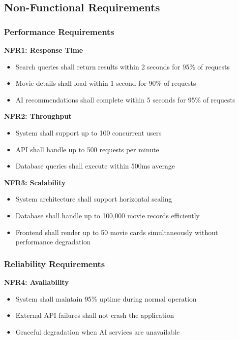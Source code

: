 \documentclass[12pt,a4paper]{article}
\begin{document}
\subsection{Non-Functional Requirements}

\subsubsection{Performance Requirements}

\textbf{NFR1: Response Time}
\begin{itemize}
    \item Search queries shall return results within 2 seconds for 95\% of requests
    \item Movie details shall load within 1 second for 90\% of requests
    \item AI recommendations shall complete within 5 seconds for 95\% of requests
\end{itemize}

\textbf{NFR2: Throughput}
\begin{itemize}
    \item System shall support up to 100 concurrent users
    \item API shall handle up to 500 requests per minute
    \item Database queries shall execute within 500ms average
\end{itemize}

\textbf{NFR3: Scalability}
\begin{itemize}
    \item System architecture shall support horizontal scaling
    \item Database shall handle up to 100,000 movie records efficiently
    \item Frontend shall render up to 50 movie cards simultaneously without performance degradation
\end{itemize}

\subsubsection{Reliability Requirements}

\textbf{NFR4: Availability}
\begin{itemize}
    \item System shall maintain 95\% uptime during normal operation
    \item External API failures shall not crash the application
    \item Graceful degradation when AI services are unavailable
\end{itemize}
\end{document}
